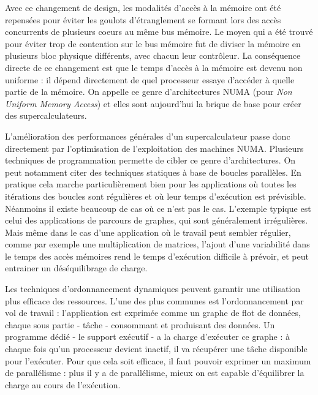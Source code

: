 Avec ce changement de design, les modalités d'accès à la mémoire ont été repensées pour éviter les goulots d'étranglement se formant lors des accès concurrents de plusieurs coeurs au même bus mémoire. Le moyen qui a été trouvé pour éviter trop de contention sur le bus mémoire fut de diviser la mémoire en plusieurs bloc physique différents, avec chacun leur contrôleur.
La conséquence directe de ce changement est que le temps d'accès à la mémoire est devenu non uniforme : il dépend directement de quel processeur essaye d'accéder à quelle partie de la mémoire.
On appelle ce genre d'architectures NUMA (pour \emph{Non Uniform Memory Access}) et elles sont aujourd'hui la brique de base pour créer des supercalculateurs.

L'amélioration des performances générales d'un supercalculateur passe donc directement par l'optimisation de l'exploitation des machines NUMA.
Plusieurs techniques de programmation permette de cibler ce genre d'architectures.
On peut notamment citer des techniques statiques à base de boucles parallèles.
En pratique cela marche particulièrement bien pour les applications où toutes les itérations des boucles sont régulières et où leur temps d'exécution est prévisible.
Néanmoins il existe beaucoup de cas où ce n'est pas le cas.
L'exemple typique est celui des applications de parcours de graphes, qui sont généralement irrégulières.
Mais même dans le cas d'une application où le travail peut sembler régulier, comme par exemple une multiplication de matrices, l'ajout d'une variabilité dans le temps des accès mémoires rend le temps d'exécution difficile à prévoir, et peut entrainer un déséquilibrage de charge.


Les techniques d'ordonnancement dynamiques peuvent garantir une utilisation plus efficace des ressources.
L'une des plus communes est l'ordonnancement par vol de travail : l'application est exprimée comme un graphe de flot de données, chaque sous partie - tâche - consommant et produisant des données.
Un programme dédié - le support exécutif - a la charge d'exécuter ce graphe : à chaque fois qu'un processeur devient inactif, il va récupérer une tâche disponible pour l'exécuter.
Pour que cela soit efficace, il faut pouvoir exprimer un maximum de parallélisme : plus il y a de parallélisme, mieux on est capable d'équilibrer la charge au cours de l'exécution.

